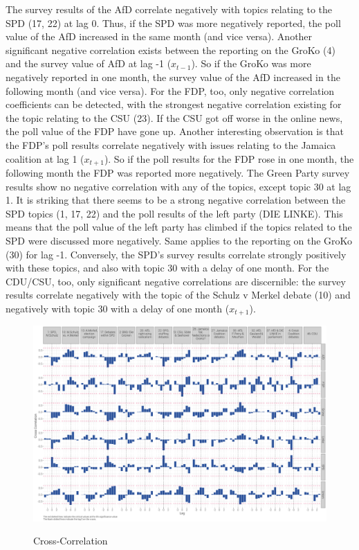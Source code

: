 \documentclass[12pt,a4paper,notitlepage]{article}
\begin{document}
The survey results of the AfD correlate negatively with topics relating to the SPD (17, 22) at lag 0. Thus, if the SPD was more negatively reported, the poll value of the AfD increased in the same month (and vice versa). Another significant negative correlation exists between the reporting on the GroKo (4) and the survey value of AfD at lag -1 ($x_{t-1}$). So if the GroKo was more negatively reported in one month, the survey value of the AfD increased in the following month (and vice versa). For the FDP, too, only negative correlation coefficients can be detected, with the strongest negative correlation existing for the topic relating to the CSU (23). If the CSU got off worse in the online news, the poll value of the FDP have gone up. Another interesting observation is that the FDP's poll results correlate negatively with issues relating to the Jamaica coalition at lag 1 ($x_{t+1}$). So if the poll results for the FDP rose in one month, the following month the FDP was reported more negatively. The Green Party survey results show no negative correlation with any of the topics, except topic 30 at lag 1. It is striking that there seems to be a strong negative correlation between the SPD topics (1, 17, 22) and the poll results of the left party (DIE LINKE). This means that the poll value of the left party has climbed if the topics related to the SPD were discussed more negatively. Same applies to the reporting on the GroKo (30) for lag -1. Conversely, the SPD's survey results correlate strongly positively with these topics, and also with topic 30 with a delay of one month. For the CDU/CSU, too, only significant negative correlations are discernible: the survey results correlate negatively with the topic of the Schulz v Merkel debate (10) and negatively with topic 30 with a delay of one month ($x_{t+1}$). 

\begin{figure}[H]
	\caption{Cross-Correlation}
	\begin{center}
			\includegraphics[width=\textwidth,keepaspectratio]{../figs/ccf2.png}
			\label{fig_ccf}
	\end{center}
\end{figure} 
\end{document}
